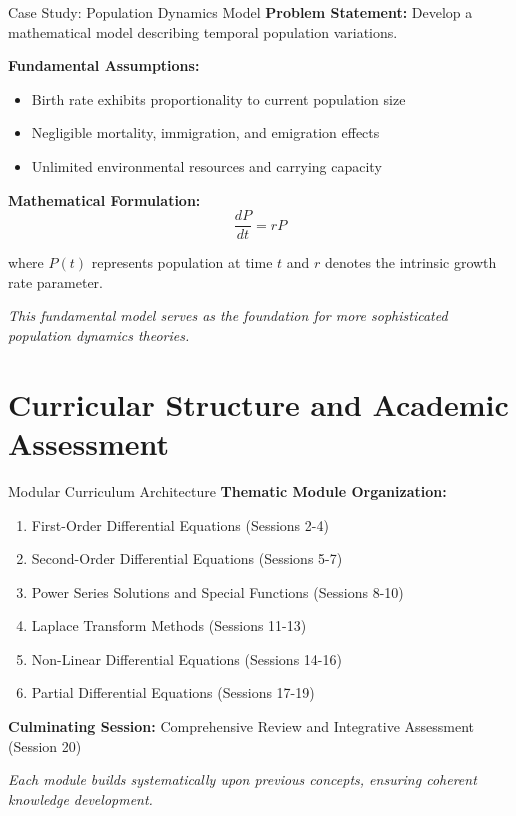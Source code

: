 \documentclass[10pt,aspectratio=169]{beamer}
\newcommand{\concept}[1]{\textbf{#1}}
\newcommand{\emphasis}[1]{\textit{#1}}
\begin{document}
\begin{frame}{Case Study: Population Dynamics Model}
    \concept{Problem Statement:} Develop a mathematical model describing temporal population variations.
    
    
    \concept{Fundamental Assumptions:}
    \begin{itemize}
        \item Birth rate exhibits proportionality to current population size
        \item Negligible mortality, immigration, and emigration effects
        \item Unlimited environmental resources and carrying capacity
    \end{itemize}
    
    
    \concept{Mathematical Formulation:}
    \begin{equation}
        \frac{dP}{dt} = rP
    \end{equation}
    
    where $P(t)$ represents population at time $t$ and $r$ denotes the intrinsic growth rate parameter.
    
    
    \emphasis{This fundamental model serves as the foundation for more sophisticated population dynamics theories.}
\end{frame}

\section{Curricular Structure and Academic Assessment}

\begin{frame}{Modular Curriculum Architecture}
    \concept{Thematic Module Organization:}
    
    
    \begin{enumerate}
        \item First-Order Differential Equations (Sessions 2-4)
        \item Second-Order Differential Equations (Sessions 5-7)
        \item Power Series Solutions and Special Functions (Sessions 8-10)
        \item Laplace Transform Methods (Sessions 11-13)
        \item Non-Linear Differential Equations (Sessions 14-16)
        \item Partial Differential Equations (Sessions 17-19)
    \end{enumerate}
    
    
    \concept{Culminating Session:} Comprehensive Review and Integrative Assessment (Session 20)
    
    
    \emphasis{Each module builds systematically upon previous concepts, ensuring coherent knowledge development.}
\end{frame}
\end{document}
